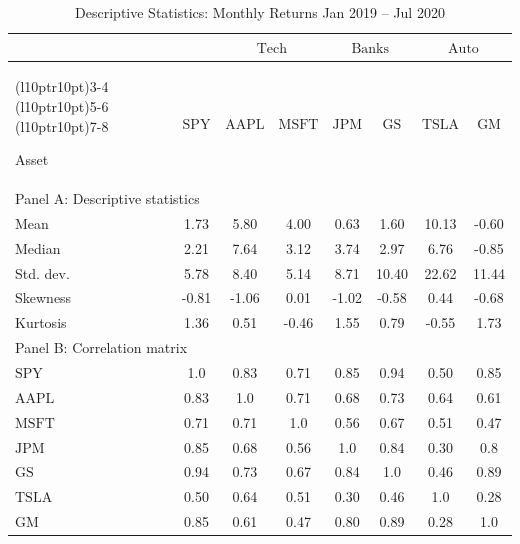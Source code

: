 \documentclass{article}
\newcommand\mc[1]{\multicolumn{1}{c}{$\text{#1}$}}
\begin{document}
\begin{table}[ht!]
\setlength\tabcolsep{6pt}
\footnotesize
  \centering
  \caption{\normalsize Descriptive Statistics: Monthly Returns Jan 2019 -- Jul 2020}

	\begin{tabular}{lccccccc}

	\toprule
			&  & \multicolumn{2}{c}{$\text{Tech}$} & \multicolumn{2}{c}{$\text{Banks}$} & \multicolumn{2}{c}{$\text{Auto}$} \\[0.25ex]

	\cmidrule(l{10pt}r{10pt}){3-4} \cmidrule(l{10pt}r{10pt}){5-6} \cmidrule(l{10pt}r{10pt}){7-8}

	Asset &\mc{SPY} &\mc{AAPL} &\mc{MSFT} &\mc{JPM} & \mc{GS} & \mc{TSLA} &\mc{GM} \\[0.25ex]

	\midrule
	\multicolumn{8}{l}{Panel A: Descriptive statistics} \\[0.25ex]
	\midrule 
									
	Mean		&1.73	&5.80	&4.00	&0.63	&1.60	&10.13	&-0.60 \\[0.25ex]
	Median		&2.21	&7.64	&3.12	&3.74	&2.97	&6.76	&-0.85 \\[0.25ex]
	Std. dev.	&5.78	&8.40	&5.14	&8.71	&10.40	&22.62	&11.44 \\[0.25ex]
	Skewness	&-0.81	&-1.06	&0.01	&-1.02	&-0.58	&0.44	&-0.68 \\[0.25ex]
	Kurtosis	&1.36	&0.51	&-0.46	&1.55	&0.79	&-0.55	&1.73 \\[0.25ex]

	 												
	\midrule
	\multicolumn{8}{l}{Panel B: Correlation matrix}\\[0.25ex]
	\midrule


	$\text{SPY}$	&1.0  	&0.83	&0.71	&0.85	&0.94	&0.50	&0.85	\\[0.25ex]
	$\text{AAPL}$	&0.83	&1.0  	&0.71	&0.68	&0.73	&0.64	&0.61 	\\[0.25ex]
	$\text{MSFT}$	&0.71	&0.71	&1.0  	&0.56	&0.67	&0.51	&0.47 	\\[0.25ex]
	$\text{JPM}$	&0.85	&0.68	&0.56	&1.0  	&0.84	&0.30	&0.8	\\[0.25ex]
	$\text{GS}$ 	&0.94	&0.73	&0.67	&0.84	&1.0  	&0.46	&0.89	\\[0.25ex]
	$\text{TSLA}$	&0.50	&0.64	&0.51	&0.30	&0.46	&1.0  	&0.28	\\[0.25ex]
	$\text{GM}$	    &0.85	&0.61	&0.47	&0.80	&0.89	&0.28	&1.0 	\\[0.25ex]

	\bottomrule

    \end{tabular}

\end{table}
\end{document}
